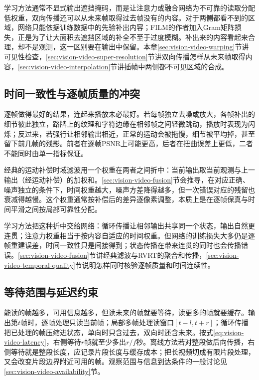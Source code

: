 学习方法通常不显式输出遮挡掩码，而是让注意力或融合网络为不可靠的读取分配低权重，双向传播还可以从未来帧取得过去帧没有的内容。对于两侧都看不到的区域，网络只能依据训练数据中的先验补出内容；FILM的作者加入Gram矩阵损失，正是为了让大面积去遮挡区域的补全不至于过度模糊。补出来的内容看起来合理，却不是观测，这一区别要在输出中保留。本章\ref{sec:vision-video-warping}节讲可见性检查，\ref{sec:vision-video-super-resolution}节讲双向传播怎样从未来帧取得内容，\ref{sec:vision-video-interpolation}节讲插帧中两侧都不可见区域的合成。

\subsection{时间一致性与逐帧质量的冲突}
\label{sec:vision-video-challenge-consistency}

逐帧做得最好的结果，连起来播放未必最好。若每帧独立去噪或放大，各帧补出的细节彼此独立，路牌上的纹理和字符边缘在相邻帧之间轻微跳动，播放时表现为闪烁；反过来，若强行让相邻输出相近，正常的运动会被拖慢，细节被平均掉，甚至留下前几帧的残影。前者在逐帧PSNR上可能更高，后者在扭曲误差上更低，二者不能同时由单一指标保证。

经典的运动补偿时域滤波用一个权重在两者之间折中：当前输出取当前观测与上一输出（经运动补偿）的加权和。\ref{sec:vision-video-fusion}节会推导，在对应正确、噪声独立的条件下，时间权重越大，噪声方差降得越多，但一次错误对应的残留也衰减得越慢。这个权重通常按补偿后的差异逐像素调整，本质上是在逐帧保真与时间平滑之间按局部可靠性分配。

学习方法把这种折中交给网络：循环传播让相邻输出共享同一个状态，输出自然更连贯；注意力权重相当于按内容自适应的时间权重。但网络的训练损失大多仍是逐帧重建误差，时间一致性只是间接得到；状态传播在带来连贯的同时也会传播错误。\ref{sec:vision-video-fusion}节讲经典滤波与RVRT的聚合和传播，\ref{sec:vision-video-temporal-quality}节说明怎样同时核验逐帧质量和时间连续性。

\subsection{等待范围与延迟约束}
\label{sec:vision-video-restoration-availability}

能读的帧越多，可用信息越多，但读未来的帧就要等待，读更多的帧就要缓存。输出第$t$帧时，逐帧处理只读当前帧；局部多帧处理读窗口$[t-l,t+r]$；循环传播把已处理的帧压缩进状态，单向时只含过去，双向时还含未来。按式\eqref{eq:vision-video-latency}，右侧等待$r$帧就至少多出$r/f$秒。离线方法若对整段做后向传播，右侧等待就是整段长度，应记录片段长度与缓存成本；把长视频切成有限片段处理，又会改变片段边界附近可用的帧。观察范围与信息到达条件的一般讨论见\ref{sec:vision-video-availability}节。

